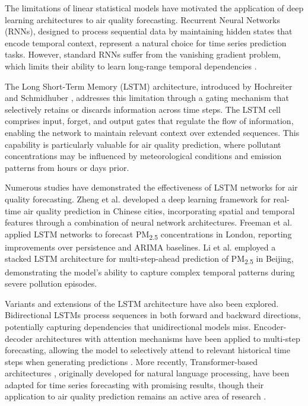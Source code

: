 The limitations of linear statistical models have motivated the application of deep learning architectures to air quality forecasting. Recurrent Neural Networks (RNNs), designed to process sequential data by maintaining hidden states that encode temporal context, represent a natural choice for time series prediction tasks. However, standard RNNs suffer from the vanishing gradient problem, which limits their ability to learn long-range temporal dependencies \cite{bengio1994learning}.

The Long Short-Term Memory (LSTM) architecture, introduced by Hochreiter and Schmidhuber \cite{hochreiter1997lstm}, addresses this limitation through a gating mechanism that selectively retains or discards information across time steps. The LSTM cell comprises input, forget, and output gates that regulate the flow of information, enabling the network to maintain relevant context over extended sequences. This capability is particularly valuable for air quality prediction, where pollutant concentrations may be influenced by meteorological conditions and emission patterns from hours or days prior.

Numerous studies have demonstrated the effectiveness of LSTM networks for air quality forecasting. Zheng et al. \cite{zheng2015forecasting} developed a deep learning framework for real-time air quality prediction in Chinese cities, incorporating spatial and temporal features through a combination of neural network architectures. Freeman et al. \cite{freeman2018forecasting} applied LSTM networks to forecast PM\textsubscript{2.5} concentrations in London, reporting improvements over persistence and ARIMA baselines. Li et al. \cite{li2017long} employed a stacked LSTM architecture for multi-step-ahead prediction of PM\textsubscript{2.5} in Beijing, demonstrating the model's ability to capture complex temporal patterns during severe pollution episodes.

Variants and extensions of the LSTM architecture have also been explored. Bidirectional LSTMs process sequences in both forward and backward directions, potentially capturing dependencies that unidirectional models miss. Encoder-decoder architectures with attention mechanisms have been applied to multi-step forecasting, allowing the model to selectively attend to relevant historical time steps when generating predictions \cite{qin2017dual}. More recently, Transformer-based architectures \cite{vaswani2017attention}, originally developed for natural language processing, have been adapted for time series forecasting with promising results, though their application to air quality prediction remains an active area of research \cite{liang2023airformer}.

